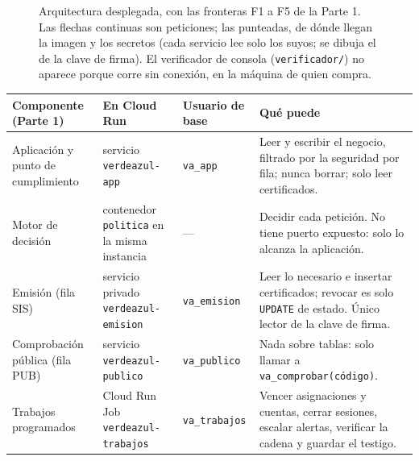 \documentclass[11pt,letterpaper]{article}
\newcommand{\cab}[1]{\textbf{\rmfamily #1}}
\newcommand{\cod}[1]{\texttt{\small #1}}
\newcommand{\arch}[1]{\texttt{\small #1}}
\begin{document}
\begin{figure}[H]
\caption{Arquitectura desplegada, con las fronteras F1 a F5 de la Parte 1. Las flechas continuas son
peticiones; las punteadas, de dónde llegan la imagen y los secretos (cada servicio lee solo los suyos;
se dibuja el de la clave de firma). El verificador de consola (\arch{verificador/}) no aparece porque
corre sin conexión, en la máquina de quien compra.}
\label{fig:arquitectura}
\end{figure}

\begin{center}
\footnotesize
\renewcommand{\arraystretch}{1.12}
\begin{tabularx}{\textwidth}{@{}L{2.5cm} L{2.6cm} L{2.4cm} Y@{}}
\toprule
\cab{Componente (Parte 1)} & \cab{En Cloud Run} & \cab{Usuario de base} & \cab{Qué puede} \\
\midrule
Aplicación y punto de cumplimiento & servicio \cod{verdeazul-app} & \cod{va\_app} & Leer y escribir el negocio, filtrado por la seguridad por fila; nunca borrar; solo leer certificados. \\
Motor de decisión & contenedor \cod{politica} en la misma instancia & — & Decidir cada petición. No tiene puerto expuesto: solo lo alcanza la aplicación. \\
Emisión (fila SIS) & servicio privado \cod{verdeazul-emision} & \cod{va\_emision} & Leer lo necesario e insertar certificados; revocar es solo \cod{UPDATE} de estado. Único lector de la clave de firma. \\
Comprobación pública (fila PUB) & servicio \cod{verdeazul-publico} & \cod{va\_publico} & Nada sobre tablas: solo llamar a \cod{va\_comprobar(código)}. \\
Trabajos programados & Cloud Run Job \cod{verdeazul-trabajos} & \cod{va\_trabajos} & Vencer asignaciones y cuentas, cerrar sesiones, escalar alertas, verificar la cadena y guardar el testigo. \\
\bottomrule
\end{tabularx}
\end{center}
\end{document}
